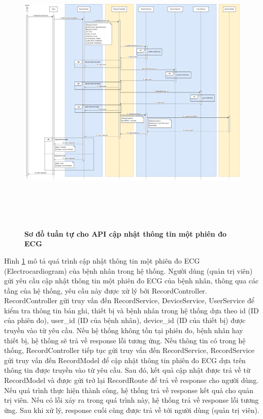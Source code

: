  \begin{figure}[H]
  \centering
  \includegraphics[width=16cm,height=14cm]{Images/sequence_api/editRecordById.png}
  \caption[Sơ đồ tuần tự cho API cập nhật thông tin một phiên đo ECG ]{\bfseries \fontsize{12pt}{0pt}
  \selectfont Sơ đồ tuần tự cho API cập nhật thông tin một phiên đo ECG }
  \label{editRecordById} %
\end{figure}
Hình \ref{editRecordById} mô tả quá trình cập nhật thông tin một phiên đo ECG (Electrocardiogram) của bệnh nhân trong hệ thống. Người dùng (quản trị viên) gửi yêu cầu cập nhật thông tin một phiên đo ECG của bệnh nhân, thông qua các tầng của hệ thống, 
yêu cầu này được xử lý bởi RecordController. RecordController gửi truy vấn đến RecordService, DeviceService, UserService để kiểm tra thông tin bản ghi, thiết bị và bệnh nhân trong hệ thống dựa theo id (ID của phiên đo), user\_id (ID của bệnh nhân), device\_id (ID của thiết bị)
 được truyền vào từ yêu cầu. Nếu hệ thống không tồn tại phiên đo, bệnh nhân hay thiết bị, hệ thống sẽ trả về response lỗi tương ứng. Nếu thông tin có trong hệ thống, RecordController tiếp tục gửi truy vấn đến RecordService, RecordService gửi truy vấn đến RecordModel để cập nhật thông tin
phiên đo ECG dựa trên thông tin được truyền vào từ yêu cầu. Sau đó, kết quả cập nhật được trả về từ RecordModel và được gửi trở lại RecordRoute để trả về response cho người dùng. Nếu quá trình thực hiện thành công, hệ thống trả về response kết quả cho quản trị viên. Nếu có lỗi xảy ra
 trong quá trình này, hệ thống trả về response lỗi tương ứng. Sau khi xử lý, response cuối cùng được trả về tới người dùng (quản trị viên).

